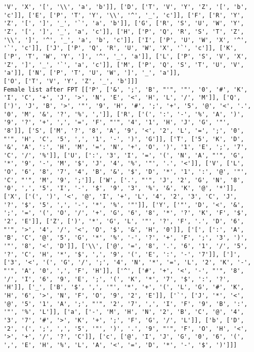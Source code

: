 \documentclass{article}
\begin{document}
\begin{verbatim}
'V', 'X', '[', '\\', 'a', 'b']], ['D', ['T', 'V', 'Y', 'Z', '[', 'b', 'c']], ['E', ['P', 'T', 'Y', '\\', '^', '_', 'c']], ['F', ['R', 'Y', 'Z', '[', ']', '_', '`', 'a', 'b']], ['G', ['R', 'S', 'U', 'W', 'Y', 'Z', '[', ']', '_', 'a', 'c']], ['H', ['P', 'Q', 'R', 'S', 'T', 'Z', '\\', ']', '^', '_', 'a', 'b', 'c']], ['I', ['P', 'U', 'W', 'X', '^', '`', 'c']], ['J', ['P', 'Q', 'R', 'U', 'W', 'X', '`', 'c']], ['K', ['P', 'T', 'W', 'Y', ']', '^', '_', 'a']], ['L', ['P', 'S', 'V', 'X', 'Z', ']', '_', '`', 'a', 'c']], ['M', ['P', 'Q', 'S', 'T', 'U', 'V', 'a']], ['N', ['P', 'T', 'U', 'W', ']', '_', 'a']], 
['O', ['T', 'V', 'Y', 'Z', '_', 'b']]]
Female list after FPT [['P', ['&', ';', 'B', "'", '"', '0', '#', 'K', 'I', 'C', '+', 'J', '>', 'N', 'E', '<', 'H', 'L', '/', 'M']], ['Q', [')', 'J', 'B', '>', '"', '9', 'H', '#', ';', '+', '5', '@', '<', '.', '0', 'M', '&', '?', '%', ',']], ['R', ['(', ':', '-', '%', 'A', ')', '9', '?', '+', ',', '=', 'F', "'", '4', '1', 'H', 'J', 'G', '"', '8']], ['S', ['M', '?', '8', 'A', '9', '<', '2', 'L', '=', ';', '0', "'", 'H', 'C', '5', ',', '1', '-', ')', 'G']], ['T', ['5', 'K', 'D', '&', 'A', ':', 'H', 'M', '=', 'N', '+', 'O', ')', '1', 'E', ';', '7', 'C', '/', '%']], ['U', [':', '3', 'I', '=', '(', 'N', 'A', "'", 'G', '*', '9', '-', 'M', '$', 'J', '4', '%', '"', '.', '<']], ['V', ['L', 'O', '6', '8', '7', '4', 'B', '&', '$', 'D', '*', '1', ':', '@', '"', 'C', "'", 'M', '9', ';']], ['W', ['.', "'", 'J', '2', 'G', 'N', '8', '0', ',', '5', 'I', '-', '$', '9', '3', '%', '&', 'K', '@', '*']], ['X', ['(', ')', '<', '@', 'I', '+', 'L', '4', '2', '3', 'C', 'J', '?', '$', '5', ',', '-', '*', '%', '"']], ['Y', ['"', 'D', '<', '&', ';', '=', '(', 'O', '/', '+', 'G', '6', '8', '*', '?', 'K', 'F', '$', '2', 'E']], ['Z', [')', '*', 'G', 'L', '"', '?', 'F', '.', 'D', '6', "'", '>', '4', '/', '<', 'O', '$', '&', 'H', '0']], ['[', [':', 'A', 'B', 'C', '@', '5', 'G', '*', '%', '-', '?', '+', 'F', ';', '3', ')', '"', '8', '<', 'D']], ['\\', ['@', '=', '8', '.', '6', '1', '/', '5', '?', 'C', 'H', '*', '$', ',', '9', '(', 'E', ':', '-', '7']], [']', ['3', '<', '(', 'G', '/', ';', '4', 'N', '*', '=', 'L', '2', 'K', '-', "'", 'A', '0', ',', 'F', 'H']], ['^', ['#', '+', '<', '-', "'", '8', '/', 'I', '6', '9', 'E', ';', '(', 'K', '*', '7', '$', ':', '?', 'H']], ['_', ['B', '$', ',', '"', '*', '+', '(', 'L', 'G', '#', 'K', 'H', '6', '>', 'N', 'F', 'O', '9', '2', 'E']], ['`', ['J', '*', '<', '@', '5', '1', 'A', ';', "'", '2', '7', ',', 'I', 'F', '9', 'B', ':', '"', '%', 'L']], ['a', ['-', 'M', 'H', 'N', '2', 'B', 'C', '@', '4', '3', '7', '#', '>', 'K', '+', ';', 'F', 'G', '/', 'L']], ['b', ['D', '2', '(', ';', ',', '5', '"', ')', '.', '9', "'", 'F', 'O', 'H', '<', '>', '+', '/', '?', 'C']], ['c', ['@', 'I', 'J', 'G', '0', '6', '(', ',', 'E', 'H', '%', 'L', 'A', '<', '=', 'D', '*', '-', '$', ')']]]


\end{verbatim}
\end{document}
